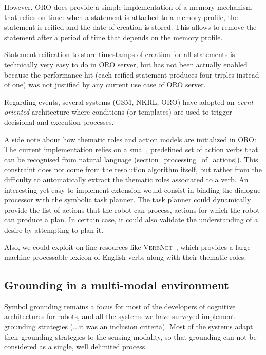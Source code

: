 However, ORO does provide a simple implementation of a memory mechanism that
relies on time: when a statement is attached to a memory profile, the statement
is reified and the date of creation is stored. This allows to remove the
statement after a period of time that depends on the memory profile.

Statement reification to store timestamps of creation for all statements is
technically very easy to do in ORO server, but has not been actually enabled
because the performance hit (each reified statement produces four triples
instead of one) was not justified by any current use case of ORO server.

Regarding events, several systems (GSM, NKRL, ORO) have adopted an {\em
event-oriented} architecture where conditions (or templates) are used to
trigger decisional and execution processes.

A side note about how thematic roles and action models are initialized in ORO:
The current implementation relies on a small, predefined set of action verbs
that can be recognised from natural language
(section~\ref{processing_of_actions}).  This constraint does not come from the
resolution algorithm itself, but rather from the difficulty to automatically
extract the thematic roles associated to a verb. An interesting yet easy to
implement extension would consist in binding the dialogue processor with the
symbolic task planner. The task planner could dynamically provide the list of
actions that the robot can process, \ie actions for which the robot can produce
a plan. In certain case, it could also validate the understanding of a desire
by attempting to plan it.

Also, we could exploit on-line resources like
\textsc{VerbNet}~\cite{Kipper2008}, which provides a large machine-processable
lexicon of English verbs along with their thematic roles.


\subsection{Grounding in a multi-modal environment}

Symbol grounding remains a focus for most of the developers of cognitive
architectures for robots, and all the systems we have surveyed implement
grounding strategies (...it was an inclusion criteria). Most of the systems
adapt their grounding strategies to the sensing modality, so that grounding can
not be considered as a single, well delimited process.


